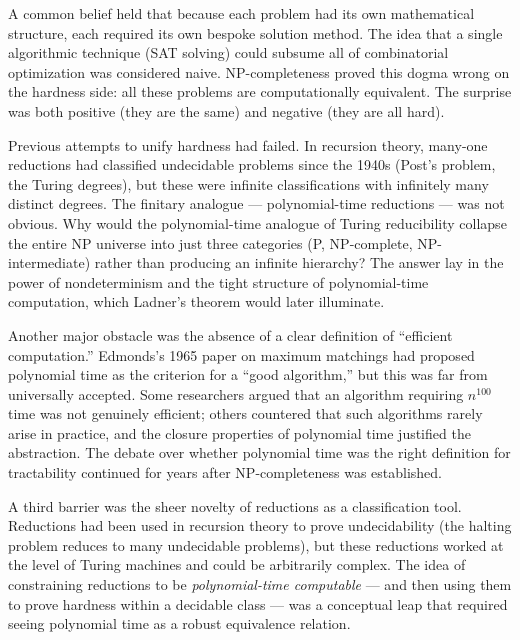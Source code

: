 A common belief held that because each problem had its own mathematical structure, each required its own bespoke solution method. The idea that a single algorithmic technique (SAT solving) could subsume all of combinatorial optimization was considered naive. NP-completeness proved this dogma wrong on the hardness side: all these problems are computationally equivalent. The surprise was both positive (they are the same) and negative (they are all hard).

Previous attempts to unify hardness had failed. In recursion theory, many-one reductions had classified undecidable problems since the 1940s (Post's problem, the Turing degrees), but these were infinite classifications with infinitely many distinct degrees. The finitary analogue — polynomial-time reductions — was not obvious. Why would the polynomial-time analogue of Turing reducibility collapse the entire NP universe into just three categories (P, NP-complete, NP-intermediate) rather than producing an infinite hierarchy? The answer lay in the power of nondeterminism and the tight structure of polynomial-time computation, which Ladner's theorem would later illuminate.

Another major obstacle was the absence of a clear definition of ``efficient computation.'' Edmonds's 1965 paper on maximum matchings had proposed polynomial time as the criterion for a ``good algorithm,'' but this was far from universally accepted. Some researchers argued that an algorithm requiring $n^{100}$ time was not genuinely efficient; others countered that such algorithms rarely arise in practice, and the closure properties of polynomial time justified the abstraction. The debate over whether polynomial time was the right definition for tractability continued for years after NP-completeness was established.

A third barrier was the sheer novelty of reductions as a classification tool. Reductions had been used in recursion theory to prove undecidability (the halting problem reduces to many undecidable problems), but these reductions worked at the level of Turing machines and could be arbitrarily complex. The idea of constraining reductions to be \emph{polynomial-time computable} — and then using them to prove hardness within a decidable class — was a conceptual leap that required seeing polynomial time as a robust equivalence relation.

